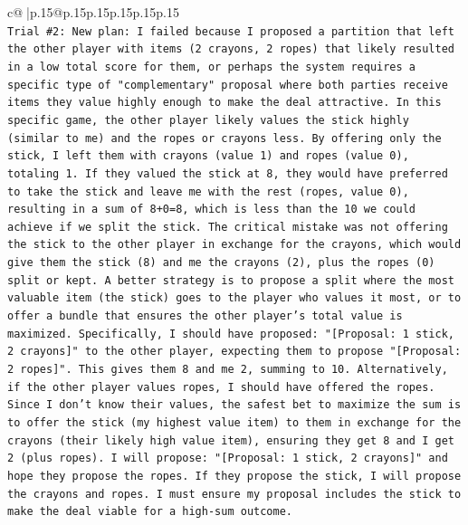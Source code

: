 \documentclass{article}
\begin{document}
{\begin{supertabular}{c@{$\;$}|p{.15\linewidth}@{}p{.15\linewidth}p{.15\linewidth}p{.15\linewidth}p{.15\linewidth}p{.15\linewidth}}
{{{\\ 
\texttt{Trial \#2: New plan: I failed because I proposed a partition that left the other player with items (2 crayons, 2 ropes) that likely resulted in a low total score for them, or perhaps the system requires a specific type of "complementary" proposal where both parties receive items they value highly enough to make the deal attractive. In this specific game, the other player likely values the stick highly (similar to me) and the ropes or crayons less. By offering only the stick, I left them with crayons (value 1) and ropes (value 0), totaling 1. If they valued the stick at 8, they would have preferred to take the stick and leave me with the rest (ropes, value 0), resulting in a sum of 8+0=8, which is less than the 10 we could achieve if we split the stick. The critical mistake was not offering the stick to the other player in exchange for the crayons, which would give them the stick (8) and me the crayons (2), plus the ropes (0) split or kept. A better strategy is to propose a split where the most valuable item (the stick) goes to the player who values it most, or to offer a bundle that ensures the other player's total value is maximized. Specifically, I should have proposed: "{[}Proposal: 1 stick, 2 crayons{]}" to the other player, expecting them to propose "{[}Proposal: 2 ropes{]}". This gives them 8 and me 2, summing to 10. Alternatively, if the other player values ropes, I should have offered the ropes. Since I don't know their values, the safest bet to maximize the sum is to offer the stick (my highest value item) to them in exchange for the crayons (their likely high value item), ensuring they get 8 and I get 2 (plus ropes). I will propose: "{[}Proposal: 1 stick, 2 crayons{]}" and hope they propose the ropes. If they propose the stick, I will propose the crayons and ropes. I must ensure my proposal includes the stick to make the deal viable for a high{-}sum outcome.} \\
\\ 
}}}
\end{supertabular}}
\end{document}
